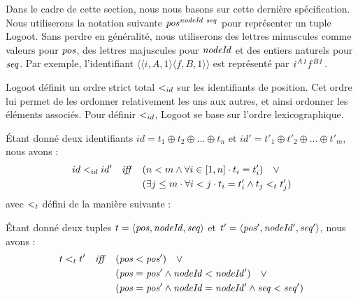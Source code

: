 Dans le cadre de cette section, nous nous basons sur cette dernière spécification.
Nous utiliserons la notation suivante $\mathit{pos}^{\mathit{nodeId~seq}}_{\mathit{}}$ pour représenter un tuple Logoot.
Sans perdre en généralité, nous utiliserons des lettres minuscules comme valeurs pour $\mathit{pos}$, des lettres majuscules pour $\mathit{nodeId}$ et des entiers naturels pour $\mathit{seq}$.
Par exemple, l'identifiant $\langle \langle i,A,1 \rangle \langle f,B,1 \rangle \rangle$ est représenté par $\mathit{i}^{\mathit{A1}}_{\mathit{}}\mathit{f}^{\mathit{B1}}_{\mathit{}}$.

Logoot définit un ordre strict total $<_{id}$ sur les identifiants de position.
Cet ordre lui permet de les ordonner relativement les uns aux autres, et ainsi ordonner les éléments associés.
Pour définir $<_{id}$, Logoot se base sur l'ordre lexicographique.
\begin{definition}
  Étant donné deux identifiants $id = t_1 \oplus t_2 \oplus ... \oplus t_n$ et $id' = t'_1 \oplus t'_2 \oplus ... \oplus t'_m$, nous avons :
  \begin{equation*}
    \begin{split}
      id <_{id} id' \quad \mathit{iff} \quad     & (n < m \land \forall i \in [1,n] \cdot t_i = t'_i) \quad \lor \\
                                            & (\exists j \leq m \cdot \forall i < j \cdot t_i = t'_i \land t_j <_{t} t'_j) \\
    \end{split}
  \end{equation*}
  avec $<_{t}$ défini de la manière suivante :
  \begin{subdefinition}
    Étant donné deux tuples $t = \langle \mathit{pos},\mathit{nodeId},\mathit{seq} \rangle$ et $t' = \langle \mathit{pos'},\mathit{nodeId'},\mathit{seq'} \rangle$, nous avons :
    \begin{equation*}
      \begin{split}
        t <_{t} t' \quad \mathit{iff} \quad  & (\mathit{pos} < \mathit{pos}') \quad \lor \\
                                            & (\mathit{pos} = \mathit{pos'} \land \mathit{nodeId} < \mathit{nodeId'}) \quad \lor \\
                                            & (\mathit{pos} = \mathit{pos'} \land \mathit{nodeId} = \mathit{nodeId'} \land \mathit{seq} < \mathit{seq'}) \\
      \end{split}
    \end{equation*}
  \end{subdefinition}
\end{definition}


